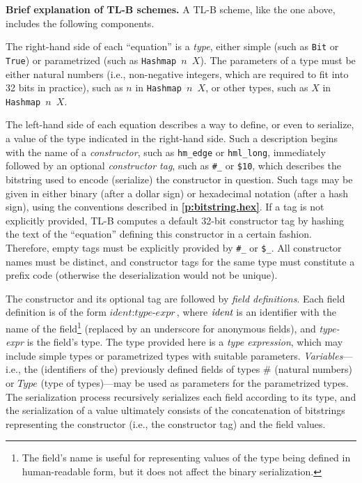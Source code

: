 \documentclass[12pt,oneside]{article}
\def\makepoint#1{\medbreak\noindent{\bf #1.\ }}
\def\nxsubpoint{\refstepcounter{subsubsection}%
    \smallbreak\makepoint{\thesubsubsection}}
\def\refpoint#1{{\rm\textbf{\ref{#1}}}}
\let\ptref=\refpoint
\def\emb#1{\textbf{#1.}}
\let\tp=\textit
\def\Type{\tp{Type}}
\begin{document}
    \nxsubpoint\label{sp:tlb.brief}\emb{Brief explanation of TL-B schemes}
    A TL-B scheme, like the one above, includes the following components.

    The right-hand side of each ``equation'' is a {\em type}, either simple (such as {\tt Bit} or {\tt True}) or parametrized (such as {\tt Hashmap $n$ $X$}). The parameters of a type must be either natural numbers (i.e., non-negative integers, which are required to fit into 32 bits in practice), such as $n$ in {\tt Hashmap $n$ $X$}, or other types, such as $X$ in {\tt Hashmap $n$ $X$}.

The left-hand side of each equation describes a way to define, or even to serialize, a value of the type indicated in the right-hand side. Such a description begins with the name of a {\em constructor}, such as {\tt hm\_edge} or {\tt hml\_long}, immediately followed by an optional {\em constructor tag}, such as {\tt \#\_} or {\tt \$10}, which describes the bitstring used to encode (serialize) the constructor in question. Such tags may be given in either binary (after a dollar sign) or hexadecimal notation (after a hash sign), using the conventions described in \ptref{p:bitstring.hex}. If a tag is not explicitly provided, TL-B computes a default 32-bit constructor tag by hashing the text of the ``equation'' defining this constructor in a certain fashion. Therefore, empty tags must be explicitly provided by {\tt \#\_} or {\tt \$\_}. All constructor names must be distinct, and constructor tags for the same type must constitute a prefix code (otherwise the deserialization would not be unique).

The constructor and its optional tag are followed by {\em field definitions}. Each field definition is of the form ${\textit{ident}}:{\textit{type-expr}}$, where ${\textit{ident}}\/$ is an identifier with the name of the field\footnote{The field's name is useful for representing values of the type being defined in human-readable form, but it does not affect the binary serialization.} (replaced by an underscore for anonymous fields), and {\textit{type-expr}} is the field's type. The type provided here is a {\em type expression}, which may include simple types or parametrized types with suitable parameters. {\em Variables}---i.e., the (identifiers of the) previously defined fields of types $\#$ (natural numbers) or $\Type$ (type of types)---may be used as parameters for the parametrized types. The serialization process recursively serializes each field according to its type, and the serialization of a value ultimately consists of the concatenation of bitstrings representing the constructor (i.e., the constructor tag) and the field values.
\end{document}
